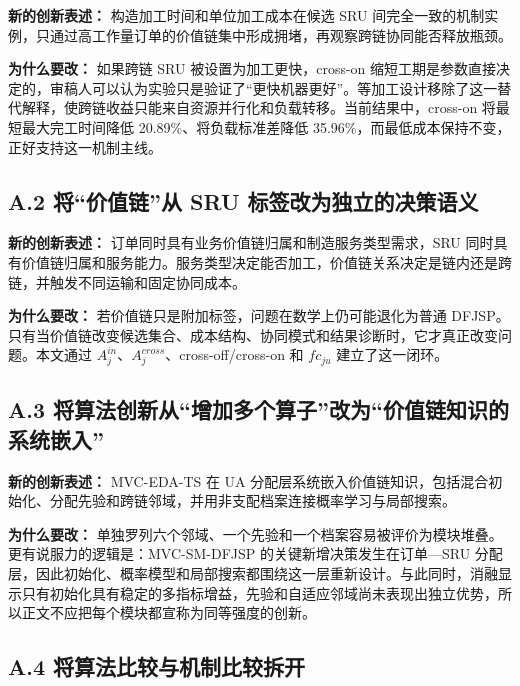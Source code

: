 \documentclass[UTF8,11pt]{ctexart}
\begin{document}
\textbf{新的创新表述：} 构造加工时间和单位加工成本在候选 SRU 间完全一致的机制实例，只通过高工作量订单的价值链集中形成拥堵，再观察跨链协同能否释放瓶颈。

\textbf{为什么要改：} 如果跨链 SRU 被设置为加工更快，cross-on 缩短工期是参数直接决定的，审稿人可以认为实验只是验证了“更快机器更好”。等加工设计移除了这一替代解释，使跨链收益只能来自资源并行化和负载转移。当前结果中，cross-on 将最短最大完工时间降低 20.89\%、将负载标准差降低 35.96\%，而最低成本保持不变，正好支持这一机制主线。

\subsection*{A.2 将“价值链”从 SRU 标签改为独立的决策语义}

\textbf{新的创新表述：} 订单同时具有业务价值链归属和制造服务类型需求，SRU 同时具有价值链归属和服务能力。服务类型决定能否加工，价值链关系决定是链内还是跨链，并触发不同运输和固定协同成本。

\textbf{为什么要改：} 若价值链只是附加标签，问题在数学上仍可能退化为普通 DFJSP。只有当价值链改变候选集合、成本结构、协同模式和结果诊断时，它才真正改变问题。本文通过 \(A_j^{in}\)、\(A_j^{cross}\)、cross-off/cross-on 和 \(fc_{ju}\) 建立了这一闭环。

\subsection*{A.3 将算法创新从“增加多个算子”改为“价值链知识的系统嵌入”}

\textbf{新的创新表述：} MVC-EDA-TS 在 UA 分配层系统嵌入价值链知识，包括混合初始化、分配先验和跨链邻域，并用非支配档案连接概率学习与局部搜索。

\textbf{为什么要改：} 单独罗列六个邻域、一个先验和一个档案容易被评价为模块堆叠。更有说服力的逻辑是：MVC-SM-DFJSP 的关键新增决策发生在订单—SRU 分配层，因此初始化、概率模型和局部搜索都围绕这一层重新设计。与此同时，消融显示只有初始化具有稳定的多指标增益，先验和自适应邻域尚未表现出独立优势，所以正文不应把每个模块都宣称为同等强度的创新。

\subsection*{A.4 将算法比较与机制比较拆开}
\end{document}
